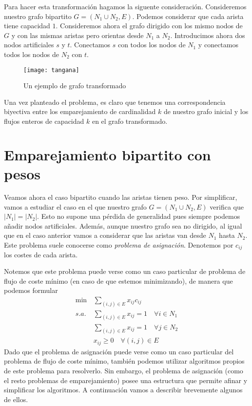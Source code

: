 \documentclass[twoside,12pt]{article}
\begin{document}
Para hacer esta transformación hagamos la siguente consideración. Consideremos nuestro grafo bipartito $G=(N_1\cup N_2,E)$. Podemos considerar que cada arista tiene capacidad $1$. Consideremos ahora el grafo dirigido con los mismo nodos de $G$ y con las mismas aristas pero orientas desde $N_1$ a $N_2$. Introducimos ahora dos nodos artificiales $s$ y $t$. Conectamos $s$ con todos los nodos de $N_1$ y conectamos todos los nodos de $N_2$ con $t$.  

\begin{figure}[h!]
\centering
\texttt{[image: tangana]}
\caption{Un ejemplo de grafo transformado}
\end{figure}
Una vez planteado el problema, es claro que tenemos una correspondencia biyectiva entre los emparejamiento de cardinalidad $k$ de nuestro grafo inicial y los flujos enteros de capacidad $k$ en el grafo transformado.
\section{Emparejamiento bipartito con pesos}
Veamos ahora el caso bipartito cuando las aristas tienen peso. Por simplificar, vamos a estudiar el caso en el que nuestro grafo $G=(N_1\cup N_2,E)$ verifica que $|N_1| = |N_2|$. Esto no supone una pérdida de generalidad pues siempre podemos añadir nodos artificiales. Además, aunque nuestro grafo sea no dirigido, al igual que en el caso anterior vamos a considerar que las aristas van desde $N_1$ hasta $N_2$. Este problema suele conocerse como \textit{problema de asignación}. Denotemos por $c_{ij}$ los costes de cada arista.

Notemos que este problema puede verse como un caso particular de problema de flujo de coste mínimo (en caso de que estemos minimizando), de manera que podemos formular
\begin{align*}
\min &\sum_{(i,j)\in E} x_{ij}c_{ij}\\
s.a.\;& \sum_{(i,j)\in E} x_{ij} = 1 \quad \forall i \in N_1\\
&\sum_{(i,j) \in E} x_{ij} = 1 \quad \forall j \in N_2\\
&x_{ij} \geq0 \quad \forall (i,j)\in E
\end{align*}
Dado que el problema de asignación puede verse como un caso particular del problema de flujo de coste mínimo, también podemos utilizar algoritmos propios de este problema para resolverlo. Sin embargo, el problema de asignación (como el resto problemas de emparejamiento) posee una estructura que permite afinar y simplificar los algoritmos. A continuación vamos a describir brevemente algunos de ellos.
\end{document}

